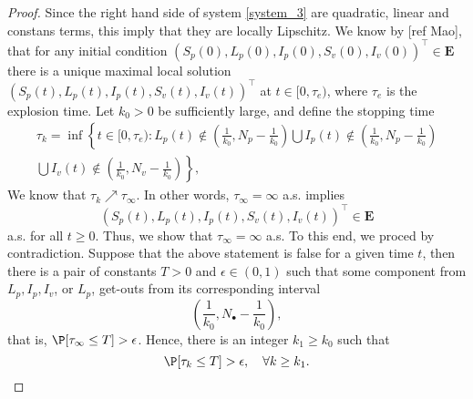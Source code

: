 \begin{proof}
		Since the right hand side of system \eqref{system_3} are quadratic, 
	linear and constans terms, this imply that they are locally Lipschitz. We 
	know by [ref Mao], that for any initial condition
	$
		(
			S_p(0),
			L_p(0),
			I_p(0),
			S_v (0),
			I_v(0)
		)^{\top} \in \mathbf{E}
	$ 
	there is a unique maximal local solution 
	$(S_p(t), L_p(t), I_p(t), S_v(t), I_v(t))^{\top}$ 
	at $t\in [0,\tau_e)$, where 
	$\tau_e$ is the explosion time. Let $k_0>0$ be sufficiently large, and 
	define the stopping time
	\begin{multline}
		\label{eqn:invariatn_set}
		\tau_k = %
			\inf
			\left\{
				t \in [0,\tau_e)
				: 
				L_p(t) \notin 
					\left(
						\frac{1}{k_0},
					 N_p - \frac{1}{k_0}
					\right)		
			 \bigcup 
				I_p(t)
				\notin
				\left(
					\frac{1}{k_0}, 
					N_p-\frac{1}{k_0}
				\right)
			\right.
			\\
			\bigcup
			\left.		
					I_v(t) 
					\notin
					\left(
						\frac{1}{k_0},
						N_v - \frac{1}{k_0}
					\right)
			\right\},
		\end{multline}
%	
	We know that $\tau_k \nearrow \tau_\infty$. 
	In other words, $\tau_\infty = \infty$ a.s. 
	implies
	\begin{equation}
		\label{eqn:invariance_prop}
		(
			S_p(t),
			L_p(t),
			I_p(t),
			S_v(t),
			I_v(t)
		)^{\top}\in \mathbf{E}
	\end{equation}
	 a.s. for all $t\geq 0$. Thus, 
	we  show that $\tau_\infty=\infty$ a.s. To this end,  we proced
	by contradiction. Suppose that the above statement is false for a given 
	time $t$, then there is 
	a pair of constants $T>0$ and $\epsilon  \in (0,1)$  such that some 
	component from $L_p,I_p,I_v$, or $L_p$, get-outs from its corresponding 
	interval
	$$
	\left(
		\frac{1}{k_0}, 
	N_{\bullet} - \frac{1}{k_0}
	\right), 
	$$
	that is, %
	$
		\P[\tau_\infty\leq T]>\epsilon 
	$. 
	Hence, there is an integer $k_1\geq k_0$ such that
%	
	\begin{equation}\label{Positive1}
		\P[\tau_k\leq T]>\epsilon,
		\quad \forall k\geq k_1.
	\end{equation}
	

\end{proof}
